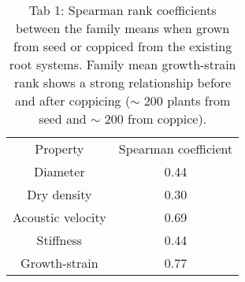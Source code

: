 
\begin{table} 
    \begin{tabular}{ c c }
Property          & Spearman coefficient \\
Diameter          & 0.44                 \\
Dry density       & 0.30                 \\
Acoustic velocity & 0.69                 \\
Stiffness         & 0.44                 \\
Growth-strain     & 0.77  
    \end{tabular} 
    \caption{Tab 1: Spearman rank coefficients between the family means when grown from seed or coppiced from the existing root systems. Family mean growth-strain rank shows a strong relationship before and after coppicing (\(\sim\) 200 plants from seed and \(\sim\) 200 from coppice). } 
\end{table}